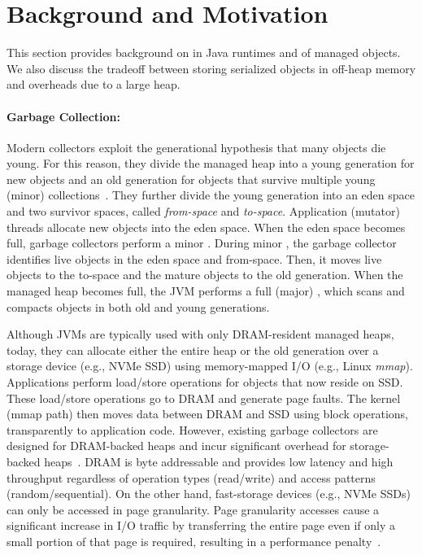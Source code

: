 \section{Background and Motivation}

This section provides background on \teraheapGC in Java runtimes and \teraheapSD of managed objects.
We also discuss the tradeoff between storing serialized objects in off-heap memory and \teraheapGC overheads due to a large heap.

\paragraph{\textbf{Garbage Collection:}}
Modern collectors exploit the generational hypothesis that many objects die young.
For this reason, they divide the managed heap into a young generation for new objects and an old generation for objects that survive multiple young (minor) collections~\cite{Ungar:1984:GSN}.
They further divide the young generation into an eden space and two survivor spaces, called \emph{from-space} and \emph{to-space}.
Application (mutator) threads allocate new objects into the eden space.
When the eden space becomes full, garbage collectors perform a minor \teraheapGC.
During minor \teraheapGC, the garbage collector identifies live objects in the eden space and from-space.
Then, it moves live objects to the to-space and the mature objects to the old generation.
When the managed heap becomes full, the JVM performs a full (major) \teraheapGC, which scans and compacts objects in both old and young generations.

Although JVMs are typically used with only DRAM-resident managed heaps, today, they can allocate either the entire heap or the old generation over a storage device (e.g., NVMe SSD) using memory-mapped I/O (e.g., Linux \emph{mmap}).
Applications perform load/store operations for objects that now reside on SSD.
These load/store operations go to DRAM and generate page faults.
The kernel (mmap path) then moves data between DRAM and SSD using block operations, transparently to application code.
However, existing garbage collectors are designed for DRAM-backed heaps and incur significant overhead for storage-backed heaps~\cite{nvm-gc-eurosys}.
DRAM is byte addressable and provides low latency and high throughput regardless of operation types (read/write) and access patterns (random/sequential).
On the other hand, fast-storage devices (e.g., NVMe SSDs) can only be accessed in page granularity.
Page granularity accesses cause a significant increase in I/O traffic by transferring the entire page even if only a small portion of that page is required, resulting in a performance penalty~\cite{flatflash, apapag:fmap}.

